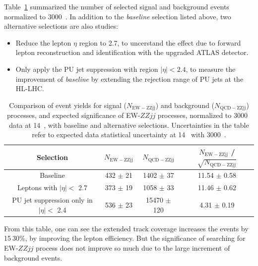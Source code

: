 Table~\ref{tab:event_yield} summarized the number of selected signal and background events normalized to 3000~\ifb.
In addition to the \textit{baseline} selection listed above, two alternative selections are also studies:
\begin{itemize}
	\item Reduce the lepton $\eta$ region to 2.7, to uncerstand the effect due to forward lepton reconstruction and identification with the upgraded ATLAS detector.
	\item Only apply the PU jet suppression with region $|\eta| < 2.4$, to measure the improvement of \textit{baseline} by extending the rejection range of PU jets at the HL-LHC.
\end{itemize}
\begin{table}[htbp]
  \small
  \centering
  \begin{tabular}{|c|c|c|c|}
    \hline
    Selection & $N_{\mathrm{EW-ZZjj}}$ & $N_{\mathrm{QCD-ZZjj}}$ & $N_{\mathrm{EW-ZZjj}}$ / $\sqrt{N_{\mathrm{QCD-ZZjj}}}$ \\
    \hline
    Baseline                                 & 432 $\pm$ 21 & 1402 $\pm$ 37   & 11.54 $\pm$ 0.58 \\
    \hline
    Leptons with $|\eta|<$ 2.7               & 373 $\pm$ 19 & 1058 $\pm$ 33   & 11.46 $\pm$ 0.62 \\
    \hline
    PU jet suppression only in $|\eta|<$ 2.4 & 536 $\pm$ 23 & 15470 $\pm$ 120 &  4.31 $\pm$ 0.19  \\
    \hline
  \end{tabular}
  \caption{
    Comparison of event yields for signal ($N_{\mathrm{EW-ZZjj}}$) and background ($N_{\mathrm{QCD-ZZjj}}$) processes, 
    and expected significance of EW-$ZZjj$ processes,
    normalized to 3000~\ifb{} data at 14~\TeV{},
    with baseline and alternative selections.
    Uncertainties in the table refer to expected data statistical uncertainty at 14~\TeV{} with 3000~\ifb{}.
  }
  \label{tab:event_yield}
\end{table}
From this table, one can see the extended track coverage increases the \lllljj events by 15$~$30\%, by improving the lepton efficiency.
But the significance of searching for EW-$ZZjj$ process does not improve so much due to the large increment of background events.

